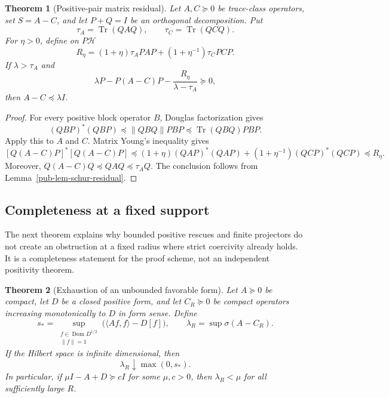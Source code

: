 \documentclass[11pt]{article}
\newtheorem{theorem}{Theorem}[section]
\theoremstyle{remark}
\DeclareMathOperator{\Tr}{Tr}
\DeclareMathOperator{\Dom}{Dom}
\begin{document}
\begin{theorem}[Positive-pair matrix residual]
\label{pub-thm-positive-pair}
Let \(A,C\succeq0\) be trace-class operators, set \(S=A-C\),
and let \(P+Q=I\) be an orthogonal decomposition.
Put
\begin{equation}
 \tau_A=\Tr(QAQ),
 \qquad \tau_C=\Tr(QCQ).
\label{pub-eq-trace-tails}
\end{equation}
For \(\eta>0\), define on \(P\mathcal H\)
\begin{equation}
 R_\eta=(1+\eta)\tau_A PAP
      +(1+\eta^{-1})\tau_C PCP.
\label{pub-eq-matrix-residual}
\end{equation}
If \(\lambda>\tau_A\) and
\begin{equation}
 \lambda P-P(A-C)P-\frac{R_\eta}{\lambda-\tau_A}\succeq0,
\label{pub-eq-positive-pair-lmi}
\end{equation}
then \(A-C\preceq\lambda I\).
\end{theorem}

\begin{proof}
For every positive block operator \(B\), Douglas factorization \cite{Douglas1966} gives
\begin{equation}
 (QBP)^*(QBP)\preceq\lVert QBQ\rVert PBP
 \preceq\Tr(QBQ)PBP.
\label{pub-eq-positive-block-factorization}
\end{equation}
Apply this to \(A\) and \(C\).
Matrix Young's inequality gives
\[
 [Q(A-C)P]^*[Q(A-C)P]
 \preceq(1+\eta)(QAP)^*(QAP)
 +(1+\eta^{-1})(QCP)^*(QCP)
 \preceq R_\eta.
\]
Moreover, \(Q(A-C)Q\preceq QAQ\preceq\tau_AQ\).
The conclusion follows from Lemma~\ref{pub-lem-schur-residual}.
\end{proof}

\subsection{Completeness at a fixed support}

The next theorem explains why bounded positive rescues and finite projectors do not create an obstruction at a fixed radius where strict coercivity already holds.
It is a completeness statement for the proof scheme,
not an independent positivity theorem.

\begin{theorem}[Exhaustion of an unbounded favorable form]
\label{pub-thm-rescue-completeness}
Let \(A\succeq0\) be compact, let \(D\) be a closed positive form,
and let \(C_R\succeq0\) be compact operators increasing monotonically to \(D\) in form sense.
Define
\begin{equation}
 s_*=\sup_{\substack{f\in\Dom D^{1/2}\\\lVert f\rVert=1}}
       \bigl(\langle Af,f\rangle-D[f]\bigr),
 \qquad
 \lambda_R=\sup\sigma(A-C_R).
\label{pub-eq-completeness-quantities}
\end{equation}
If the Hilbert space is infinite dimensional, then
\begin{equation}
                \lambda_R\downarrow\max(0,s_*).
\label{pub-eq-completeness-limit}
\end{equation}
In particular, if \(\mu I-A+D\succeq cI\) for some \(\mu,c>0\),
then \(\lambda_R<\mu\) for all sufficiently large \(R\).
\end{theorem}
\end{document}
